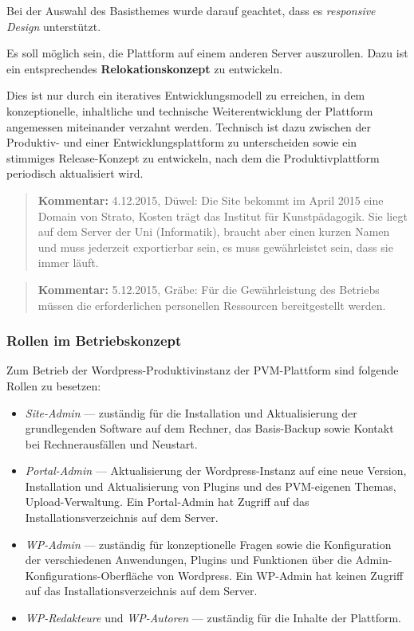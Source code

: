 \documentclass[a4paper,11pt]{article}
\newcommand{\Kommentar}[1]{
  \begin{quote}\textbf{Kommentar:} #1 \end{quote}
}
\begin{document}
Bei der Auswahl des Basisthemes wurde darauf geachtet, dass es \emph{responsive
  Design} unterstützt.

Es soll möglich sein, die Plattform auf einem anderen Server auszurollen.  Dazu
ist ein entsprechendes \textbf{Relokationskonzept} zu entwickeln.

Dies ist nur durch ein iteratives Entwicklungsmodell zu erreichen, in dem
konzeptionelle, inhaltliche und technische Weiterentwicklung der Plattform
angemessen miteinander verzahnt werden.  Technisch ist dazu zwischen der
Produktiv- und einer Entwicklungsplattform zu unterscheiden sowie ein stimmiges
Release-Konzept zu entwickeln, nach dem die Produktivplattform periodisch
aktualisiert wird.

\Kommentar{4.12.2015, Düwel: Die Site bekommt im April 2015 eine Domain von
  Strato, Kosten trägt das Institut für Kunstpädagogik. Sie liegt auf dem
  Server der Uni (Informatik), braucht aber einen kurzen Namen und muss
  jederzeit exportierbar sein, es muss gewährleistet sein, dass sie immer
  läuft.}

\Kommentar{5.12.2015, Gräbe: Für die Gewährleistung des Betriebs müssen die
  erforderlichen personellen Ressourcen bereitgestellt werden.}

\subsubsection{Rollen im Betriebskonzept} 

Zum Betrieb der Wordpress-Produktivinstanz der PVM-Plattform sind folgende
Rollen zu besetzen:
\begin{itemize}
\item \emph{Site-Admin} --- zuständig für die Installation und Aktualisierung
  der grundlegenden Software auf dem Rechner, das Basis-Backup sowie Kontakt
  bei Rechnerausfällen und Neustart.
\item \emph{Portal-Admin} --- Aktualisierung der Wordpress-Instanz auf eine
  neue Version, Installation und Aktualisierung von Plugins und des
  PVM-eigenen Themas, Upload-Verwaltung.  Ein Portal-Admin hat Zugriff auf das
  Installationsverzeichnis auf dem Server.
\item \emph{WP-Admin} --- zuständig für konzeptionelle Fragen sowie die
  Konfiguration der verschiedenen Anwendungen, Plugins und Funktionen über die
  Admin-Konfigurations-Oberfläche von Wordpress. Ein WP-Admin hat keinen
  Zugriff auf das Installationsverzeichnis auf dem Server.
\item \emph{WP-Redakteure} und \emph{WP-Autoren} --- zuständig für die Inhalte
  der Plattform.
\end{itemize}
\end{document}

